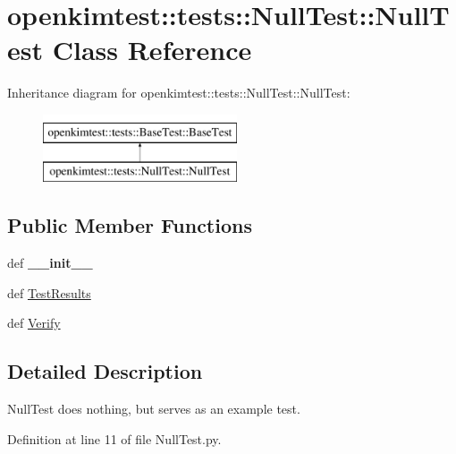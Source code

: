 \hypertarget{classopenkimtest_1_1tests_1_1NullTest_1_1NullTest}{
\section{openkimtest::tests::NullTest::NullTest Class Reference}
\label{classopenkimtest_1_1tests_1_1NullTest_1_1NullTest}
}
Inheritance diagram for openkimtest::tests::NullTest::NullTest:\begin{figure}[H]
\begin{center}
\leavevmode
\includegraphics[height=2.000000cm]{classopenkimtest_1_1tests_1_1NullTest_1_1NullTest}
\end{center}
\end{figure}
\subsection*{Public Member Functions}
\begin{DoxyCompactItemize}
\item 
\hypertarget{classopenkimtest_1_1tests_1_1NullTest_1_1NullTest_ad64d8b663f5b2ad983f1f7e2617a9c64}{
def {\bfseries \_\-\_\-init\_\-\_\-}}
\label{classopenkimtest_1_1tests_1_1NullTest_1_1NullTest_ad64d8b663f5b2ad983f1f7e2617a9c64}

\item 
def \hyperlink{classopenkimtest_1_1tests_1_1NullTest_1_1NullTest_aa42d7a887122a4283b9299e27e2d4d05}{TestResults}
\item 
def \hyperlink{classopenkimtest_1_1tests_1_1NullTest_1_1NullTest_a7a7fc0a6bbd33b627c515a53649f477f}{Verify}
\end{DoxyCompactItemize}


\subsection{Detailed Description}
\begin{DoxyVerb}NullTest does nothing, but serves as an example test.\end{DoxyVerb}
 

Definition at line 11 of file NullTest.py.



